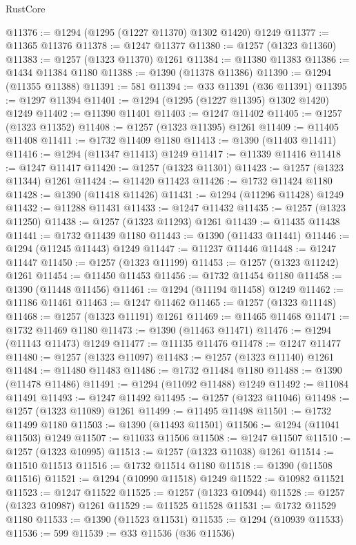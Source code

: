 \begin{lexlean}{RustCore}
\begin{coremodule}
@11376 := @1294 (@1295 (@1227 @11370) @1302 @1420) @1249
@11377 := @11365 @11376
@11378 := @1247 @11377
@11380 := @1257 (@1323 @11360)
@11383 := @1257 (@1323 @11370) @1261
@11384 := @11380 @11383
@11386 := @1434 @11384 @1180
@11388 := @1390 (@11378 @11386)
@11390 := @1294 (@11355 @11388)
@11391 := 581
@11394 := @33 @11391 (@36 @11391)
@11395 := @1297 @11394
@11401 := @1294 (@1295 (@1227 @11395) @1302 @1420) @1249
@11402 := @11390 @11401
@11403 := @1247 @11402
@11405 := @1257 (@1323 @11352)
@11408 := @1257 (@1323 @11395) @1261
@11409 := @11405 @11408
@11411 := @1732 @11409 @1180
@11413 := @1390 (@11403 @11411)
@11416 := @1294 (@11347 @11413) @1249
@11417 := @11339 @11416
@11418 := @1247 @11417
@11420 := @1257 (@1323 @11301)
@11423 := @1257 (@1323 @11344) @1261
@11424 := @11420 @11423
@11426 := @1732 @11424 @1180
@11428 := @1390 (@11418 @11426)
@11431 := @1294 (@11296 @11428) @1249
@11432 := @11288 @11431
@11433 := @1247 @11432
@11435 := @1257 (@1323 @11250)
@11438 := @1257 (@1323 @11293) @1261
@11439 := @11435 @11438
@11441 := @1732 @11439 @1180
@11443 := @1390 (@11433 @11441)
@11446 := @1294 (@11245 @11443) @1249
@11447 := @11237 @11446
@11448 := @1247 @11447
@11450 := @1257 (@1323 @11199)
@11453 := @1257 (@1323 @11242) @1261
@11454 := @11450 @11453
@11456 := @1732 @11454 @1180
@11458 := @1390 (@11448 @11456)
@11461 := @1294 (@11194 @11458) @1249
@11462 := @11186 @11461
@11463 := @1247 @11462
@11465 := @1257 (@1323 @11148)
@11468 := @1257 (@1323 @11191) @1261
@11469 := @11465 @11468
@11471 := @1732 @11469 @1180
@11473 := @1390 (@11463 @11471)
@11476 := @1294 (@11143 @11473) @1249
@11477 := @11135 @11476
@11478 := @1247 @11477
@11480 := @1257 (@1323 @11097)
@11483 := @1257 (@1323 @11140) @1261
@11484 := @11480 @11483
@11486 := @1732 @11484 @1180
@11488 := @1390 (@11478 @11486)
@11491 := @1294 (@11092 @11488) @1249
@11492 := @11084 @11491
@11493 := @1247 @11492
@11495 := @1257 (@1323 @11046)
@11498 := @1257 (@1323 @11089) @1261
@11499 := @11495 @11498
@11501 := @1732 @11499 @1180
@11503 := @1390 (@11493 @11501)
@11506 := @1294 (@11041 @11503) @1249
@11507 := @11033 @11506
@11508 := @1247 @11507
@11510 := @1257 (@1323 @10995)
@11513 := @1257 (@1323 @11038) @1261
@11514 := @11510 @11513
@11516 := @1732 @11514 @1180
@11518 := @1390 (@11508 @11516)
@11521 := @1294 (@10990 @11518) @1249
@11522 := @10982 @11521
@11523 := @1247 @11522
@11525 := @1257 (@1323 @10944)
@11528 := @1257 (@1323 @10987) @1261
@11529 := @11525 @11528
@11531 := @1732 @11529 @1180
@11533 := @1390 (@11523 @11531)
@11535 := @1294 (@10939 @11533)
@11536 := 599
@11539 := @33 @11536 (@36 @11536)

\end{coremodule}
\end{lexlean}
